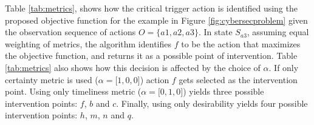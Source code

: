 Table \ref{tab:metrics}, shows how the critical trigger action is identified using the proposed objective function for the example in Figure \ref{fig:cybersecproblem} given the observation sequence of actions $O=\{a1, a2, a3\}$. In state $S_{a3}$, assuming equal weighting of metrics, the algorithm identifies $f$ to be the action that maximizes the objective function, and returns it as a possible point of intervention. Table \ref{tab:metrics} also shows how this decision is affected by the choice of $\alpha$. If only certainty metric is used ($\alpha=\lbrack1,0,0\rbrack$) action $f$ gets selected as the intervention point. Using only timeliness metric ($\alpha=\lbrack0,1,0\rbrack$) yields three possible intervention points: $f$, $b$ and $c$. Finally, using only desirability yields four possible intervention points: $h$, $m$, $n$ and $q$.

